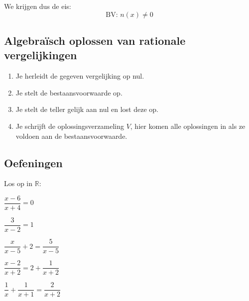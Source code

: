 \documentclass[12pt,twoside,a4paper]{article}
\begin{document}
We krijgen dus de eis:
$$ \text{BV: } n(x) \neq 0 $$

\needspace{4cm}
\subsection{Algebraïsch oplossen van rationale vergelijkingen}
\begin{enumerate}[(1)]
\item Je herleidt de gegeven vergelijking op nul.
\item Je stelt de bestaansvoorwaarde op.
\item Je stelt de teller gelijk aan nul en lost deze op.
\item Je schrijft de oplossingsverzameling $V$, hier komen alle oplossingen in als ze voldoen aan de bestaansvoorwaarde.
\end{enumerate}

\subsection{Oefeningen}

\begin{oefening} %
Los op in $\mathbb{R}$:
\begin{exlist}{2}
\item $\dfrac{x-6}{x+4}=0$
\item $\dfrac{3}{x-2}=1$
\item $\dfrac{x}{x-5}+2=\dfrac{5}{x-5}$
\item $\dfrac{x-2}{x+2}=2+\dfrac{1}{x+2}$
\item $\dfrac{1}{x}+\dfrac{1}{x+1}=\dfrac{2}{x+2}$
\end{exlist}
\end{oefening}
\end{document}
